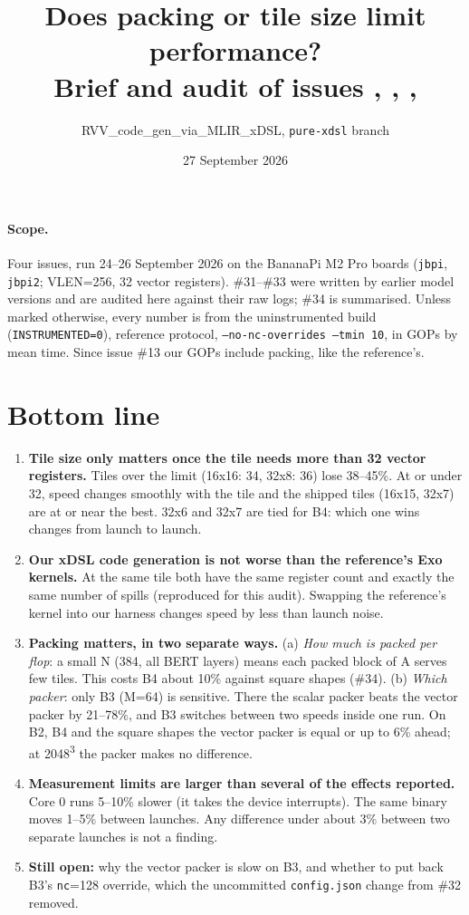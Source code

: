 \documentclass[10pt,a4paper]{article}
\title{\vspace{-1.2cm}\textbf{Does packing or tile size limit performance?}\\[2pt]
\large Brief and audit of issues \iss{31}, \iss{32}, \iss{33}, \iss{34}}
\author{RVV\_code\_gen\_via\_MLIR\_xDSL, \texttt{pure-xdsl} branch}
\date{27 September 2026}
\begin{document}
\maketitle
\vspace{-0.8cm}

\paragraph{Scope.} Four issues, run 24--26 September 2026 on the BananaPi M2 Pro boards
(\texttt{jbpi}, \texttt{jbpi2}; VLEN=256, 32 vector registers). \#31--\#33 were written by earlier
model versions and are audited here against their raw logs; \#34 is summarised. Unless marked
otherwise, every number is from the uninstrumented build (\texttt{INSTRUMENTED=0}), reference protocol,
\texttt{--no-nc-overrides --tmin 10}, in GOPs by mean time. Since issue \#13 our GOPs include packing,
like the reference's.

\section{Bottom line}
\begin{enumerate}
  \item \textbf{Tile size only matters once the tile needs more than 32 vector registers.} Tiles
  over the limit (16x16: 34, 32x8: 36) lose 38--45\%. At or under 32, speed changes smoothly with the
  tile and the shipped tiles (16x15, 32x7) are at or near the best. 32x6 and 32x7 are tied for B4:
  which one wins changes from launch to launch.
  \item \textbf{Our xDSL code generation is not worse than the reference's Exo kernels.} At the same
  tile both have the same register count and exactly the same number of spills (reproduced for this
  audit). Swapping the reference's kernel into our harness changes speed by less than launch noise.
  \item \textbf{Packing matters, in two separate ways.}
  (a) \emph{How much is packed per flop}: a small N (384, all BERT layers) means each packed block of A
  serves few tiles. This costs B4 about 10\% against square shapes (\#34).
  (b) \emph{Which packer}: only B3 (M=64) is sensitive. There the scalar packer beats the vector packer
  by 21--78\%, and B3 switches between two speeds inside one run. On B2, B4 and the square shapes the
  vector packer is equal or up to 6\% ahead; at 2048\textsuperscript{3} the packer makes no difference.
  \item \textbf{Measurement limits are larger than several of the effects reported.} Core 0 runs
  5--10\% slower (it takes the device interrupts). The same binary moves 1--5\% between launches.
  Any difference under about 3\% between two separate launches is not a finding.
  \item \textbf{Still open:} why the vector packer is slow on B3, and whether to put back B3's
  \texttt{nc}=128 override, which the uncommitted \texttt{config.json} change from \#32 removed.
\end{enumerate}
\end{document}
